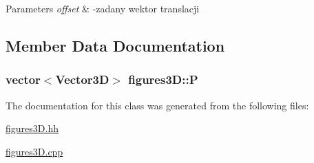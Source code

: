 \begin{DoxyParams}{Parameters}
{\em offset} & -\/zadany wektor translacji \\
\hline
\end{DoxyParams}


\subsection{Member Data Documentation}
\subsubsection[{\texorpdfstring{P}{P}}]{\setlength{\rightskip}{0pt plus 5cm}vector$<${\bf Vector3D}$>$ figures3\+D\+::P\hspace{0.3cm}{\ttfamily [protected]}}\hypertarget{classfigures3_d_a491e0281ce1e02aa7159840923cb3ef6}{}\label{classfigures3_d_a491e0281ce1e02aa7159840923cb3ef6}


The documentation for this class was generated from the following files\+:\begin{DoxyCompactItemize}
\item 
\hyperlink{figures3_d_8hh}{figures3\+D.\+hh}\item 
\hyperlink{figures3_d_8cpp}{figures3\+D.\+cpp}\end{DoxyCompactItemize}
